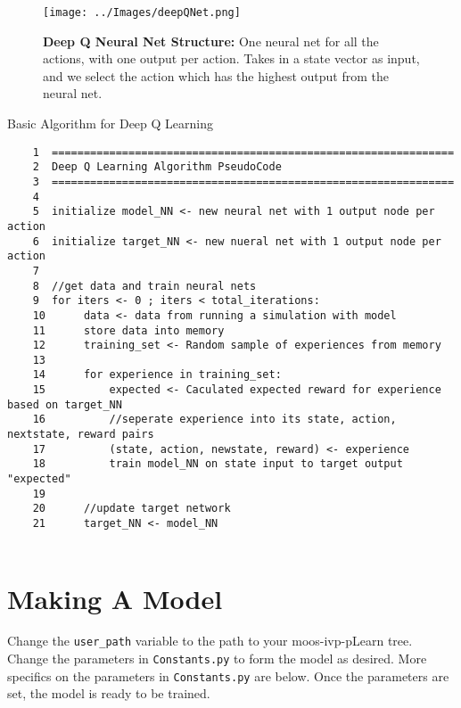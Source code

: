 \documentclass[onecolumn,letterpaper,11pt]{article}
\begin{document}
\begin{figure}[H]
	\centering 
	\texttt{[image: ../Images/deepQNet.png]}
	\caption{{\bf Deep Q Neural Net Structure:} One neural net for all the actions, with one output per action. Takes in a state vector as input, and we select the action which has the highest output from the neural net.}
	\label{fig_deep_q_net}
\end{figure}

\vspace{0.15in}
\begin{listing}{Basic Algorithm for Deep Q Learning}
	\label{lst_uSpeechRec_econfig}
	\footnotesize
	\begin{verbatim}
	1  =============================================================== 
	2  Deep Q Learning Algorithm PseudoCode                   
	3  =============================================================== 
	4                                                                  
	5  initialize model_NN <- new neural net with 1 output node per action
	6  initialize target_NN <- new nueral net with 1 output node per action
	7	
	8  //get data and train neural nets
	9  for iters <- 0 ; iters < total_iterations:
	10      data <- data from running a simulation with model 
	11      store data into memory
	12      training_set <- Random sample of experiences from memory
	13
	14      for experience in training_set: 
	15          expected <- Caculated expected reward for experience based on target_NN
	16          //seperate experience into its state, action, nextstate, reward pairs
	17          (state, action, newstate, reward) <- experience
	18          train model_NN on state input to target output "expected"
	19 
	20      //update target network
	21      target_NN <- model_NN   
	                                                     
	\end{verbatim}
	\normalsize
\end{listing}


\section{Making A Model}

Change the \texttt{user\_path} variable to the path to your moos-ivp-pLearn tree. Change the parameters in \texttt{Constants.py} to form the model as desired. More specifics on the parameters in \texttt{Constants.py} are below. Once the parameters are set, the model is ready to be trained. 
\end{document}
